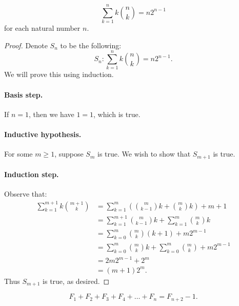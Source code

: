 \documentclass{exam}
\newcommand{\paren}[1]{\left(#1\right)}
\begin{document}
\begin{proposition}{10.24}
    $$\sum_{k=1}^nk\binom n k=n2^{n-1}$$ for each natural number $n$.
\end{proposition}

\begin{proof}
    Denote $S_n$ to be the following: $$S_n:\sum_{k=1}^nk\binom n k=n2^{n-1}.$$ We will prove this using induction.

    \paragraph{Basis step.} If $n=1$, then we have $1=1$, which is true.

    \paragraph{Inductive hypothesis.} For some $m\ge1$, suppose $S_m$ is true. We wish to show that $S_{m+1}$ is true.

    \paragraph{Induction step.} Observe that:
    \begin{align*}
        \sum_{k=1}^{m+1}k\binom{m+1}k&=\sum_{k=1}^m\paren{\binom{m}{k-1}k+\binom m kk} + m + 1\\
        &=\sum_{k=1}^{m+1}\binom{m}{k-1}k+\sum_{k=1}^m\binom m kk\\
        &=\sum_{k=0}^m\binom m k(k+1) + m2^{m-1}\\
        &=\sum_{k=0}^m\binom m kk + \sum_{k=0}^m\binom m k + m2^{m-1}\\
        &=2m2^{m-1} + 2^m\\
        &=(m+1)2^m.
    \end{align*}
    Thus $S_{m+1}$ is true, as desired.
\end{proof}

\begin{proposition}{10.25}
    $$F_1+F_2+F_3+F_4+\dots+F_n=F_{n+2}-1.$$
\end{proposition}
\end{document}
